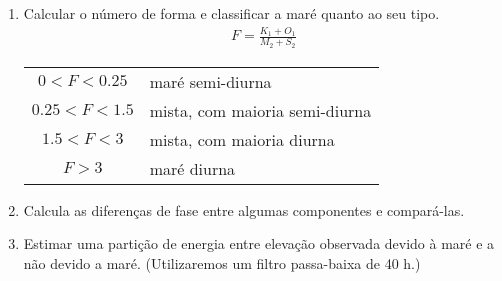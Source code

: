 \documentclass[11pt,portuguese,a4paper,pdftex]{article}
\begin{document}
\begin{enumerate}
  \item Calcular o número de forma e classificar a maré quanto ao seu tipo.
  \begin{eqnarray}\label{eq:forma}
    F = \frac{K_1 + O_1}{M_2 + S_2}
  \end{eqnarray}

  \begin{center}
    \begin{tabular}{|c|l|}\hline
      $0 < F < 0.25$ & maré semi-diurna \\
      $0.25 < F < 1.5$ & mista, com maioria semi-diurna \\
      $1.5 < F < 3$ & mista, com maioria diurna \\
      $F > 3$ & maré diurna\\ \hline
    \end{tabular}
  \end{center}

  \item Calcula as diferenças de fase entre algumas componentes e compará-las.

  \item Estimar uma partição de energia entre elevação observada devido à maré e
        a não devido a maré.  (Utilizaremos um filtro passa-baixa de 40 h.)

%
%
%


\end{enumerate}
\end{document}
